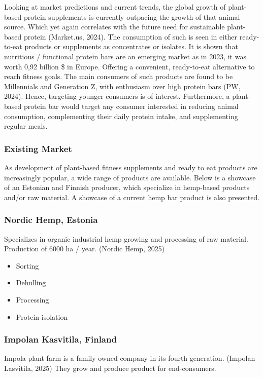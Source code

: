 \vspace{1em}
Looking at market predictions and current trends, the global growth of plant-based protein supplements is currently outpacing the growth of that animal source. Which yet again correlates with the future need for sustainable plant-based protein (Market.us, 2024). The consumption of such is seen in either ready-to-eat products or supplements as concentrates or isolates. It is shown that nutritious / functional protein bars are an emerging market as in 2023, it was worth 0,92 billion \$ in Europe. Offering a convenient, ready-to-eat alternative to reach fitness goals. The main consumers of such products are found to be Millennials and Generation Z, with enthusiasm over high protein bars (PW, 2024). Hence, targeting younger consumers is of interest. Furthermore, a plant-based protein bar would target any consumer interested in reducing animal consumption, complementing their daily protein intake, and supplementing regular meals.

\subsubsection{Existing Market}
As development of plant-based fitness supplements and ready to eat products are increasingly popular, a wide range of products are available. Below is a showcase of an Estonian and Finnish producer, which specialize in hemp-based products and/or raw material. A showcase of a current hemp bar product is also presented.

\subsubsection*{Nordic Hemp, Estonia}
Specializes in organic industrial hemp growing and processing of raw material. Production of 6000 ha / year. (Nordic Hemp, 2025)
\begin{itemize}
    \item Sorting
    \item Dehulling
    \item Processing
    \item Protein isolation
\end{itemize}

\subsubsection*{Impolan Kasvitila, Finland}
Impola plant farm is a family-owned company in its fourth generation. (Impolan Lasvitila, 2025)
They grow and produce product for end-consumers. 

